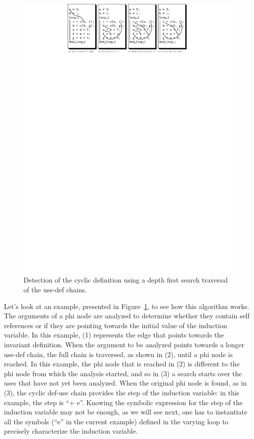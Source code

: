 \begin{figure}[h]
  \begin{center}
    \includegraphics[width=1.2\textwidth]{iv_step}
  \end{center}
  \vspace{-50em}
  \caption{Detection of the cyclic definition using a depth first
    search traversal of the use-def chains.}
  \label{spop:fig:ivstep}
\end{figure}

Let's look at an example, presented in Figure~\ref{spop:fig:ivstep},
to see how this algorithm works.  The arguments of a phi node are
analyzed to determine whether they contain self references or if they
are pointing towards the initial value of the induction variable.  In
this example, (1) represents the edge that points towards the
invariant definition.  When the argument to be analyzed points towards
a longer use-def chain, the full chain is traversed, as shown in (2),
until a phi node is reached.  In this example, the phi node that is
reached in (2) is different to the phi node from which the analysis
started, and so in (3) a search starts over the uses that have not yet
been analyzed.  When the original phi node is found, as in (3), the
cyclic def-use chain provides the step of the induction variable: in
this example, the step is ``+ e''.  Knowing the symbolic expression
for the step of the induction variable may not be enough, as we will
see next, one has to instantiate all the symbols (``e'' in the current
example) defined in the varying loop to precisely characterize the
induction variable.

